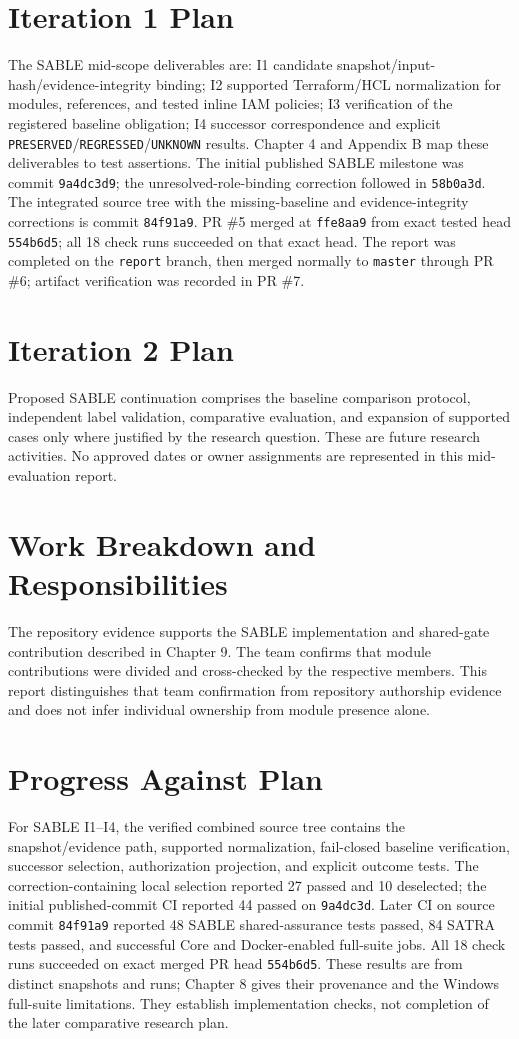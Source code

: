 \section{Iteration 1 Plan}
\begin{sloppypar}
The SABLE mid-scope deliverables are: I1 candidate snapshot/input-hash/evidence-integrity binding; I2 supported Terraform/HCL normalization for modules, references, and tested inline IAM policies; I3 verification of the registered baseline obligation; I4 successor correspondence and explicit \texttt{PRESERVED}/\texttt{REGRESSED}/\texttt{UNKNOWN} results. Chapter 4 and Appendix B map these deliverables to test assertions. The initial published SABLE milestone was commit \texttt{9a4dc3d9}; the unresolved-role-binding correction followed in \texttt{58b0a3d}. The integrated source tree with the missing-baseline and evidence-integrity corrections is commit \texttt{84f91a9}. PR \#5 merged at \texttt{ffe8aa9} from exact tested head \texttt{554b6d5}; all 18 check runs succeeded on that exact head. The report was completed on the \texttt{report} branch, then merged normally to \texttt{master} through PR \#6; artifact verification was recorded in PR \#7.
\end{sloppypar}
\section{Iteration 2 Plan}
Proposed SABLE continuation comprises the baseline comparison protocol, independent label validation, comparative evaluation, and expansion of supported cases only where justified by the research question. These are future research activities. No approved dates or owner assignments are represented in this mid-evaluation report.
\section{Work Breakdown and Responsibilities}
The repository evidence supports the SABLE implementation and shared-gate contribution described in Chapter 9. The team confirms that module contributions were divided and cross-checked by the respective members. This report distinguishes that team confirmation from repository authorship evidence and does not infer individual ownership from module presence alone.
\section{Progress Against Plan}
For SABLE I1--I4, the verified combined source tree contains the snapshot/evidence path, supported normalization, fail-closed baseline verification, successor selection, authorization projection, and explicit outcome tests. The correction-containing local selection reported 27 passed and 10 deselected; the initial published-commit CI reported 44 passed on \texttt{9a4dc3d}. Later CI on source commit \texttt{84f91a9} reported 48 SABLE shared-assurance tests passed, 84 SATRA tests passed, and successful Core and Docker-enabled full-suite jobs. All 18 check runs succeeded on exact merged PR head \texttt{554b6d5}. These results are from distinct snapshots and runs; Chapter 8 gives their provenance and the Windows full-suite limitations. They establish implementation checks, not completion of the later comparative research plan.
